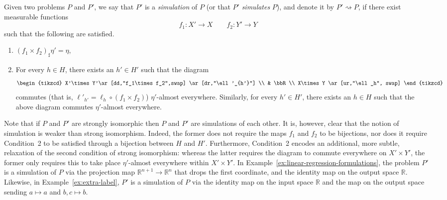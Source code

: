 \documentclass[twoside,11pt]{article}
\begin{document}
\begin{definition}
    Given two problems $P$ and $P'$, we say that $P'$ is a \emph{simulation} of $P$ (or that $P'$ \emph{simulates} $P$), and denote it by $P'\rightsquigarrow P$, if there exist measurable functions
    \[f_1:X'\to X \qquad f_2:Y'\to Y\]
    such that the following are satisfied.
    \begin{enumerate}
        \item $(f_1\times f_2)_\sharp \eta' = \eta$,       
        \item For every $h\in H$, there exists an $h'\in H'$ such that the diagram
        \[
        \begin{tikzcd}
            X'\times Y'\ar[dd,"f_1\times f_2",swap] \ar[dr,"\ell'_{h'}"]
            \\
            & \bbR
            \\
            X\times Y \ar[ur,"\ell_h", swap]
        \end{tikzcd}    
        \]
        commutes (that is, $\ell'_{h'}= \ell_h \circ (f_1\times f_2)$) $\eta'$-almost everywhere.
        Similarly, for every $h' \in H'$, there exists an $h\in H$ such that the above diagram commutes $\eta'$-almost everywhere.
    \end{enumerate}
\end{definition}

   

Note that if $P$ and $P'$ are strongly isomorphic then $P$ and $P'$ are simulations of each other. It is, however, clear that the notion of simulation is weaker than strong isomorphism. Indeed, the former does not require the maps $f_1$ and $f_2$ to be bijections, nor does it require   Condition~2 to be satisfied through a bijection between $H$ and $H'$. Furthermore, Condition~2 encodes an additional, more subtle, relaxation of the second condition of strong isomorphism: whereas the latter requires the diagram to commute everywhere on $X'\times Y'$, the former only requires this to take place $\eta'$-almost everywhere within $X'\times Y'$. In Example~\ref{ex:linear-regression-formulations}, the problem $P'$ is a simulation of $P$ via the projection map $\mathbb R^{n+1} \to \mathbb R^n$ that drops the first coordinate, and the identity map on the output space $\mathbb R$. Likewise, in Example~\ref{ex:extra-label}, $P'$ is a simulation of $P$ via the identity map on the input space $\mathbb R$ and the map on the output space sending $a\mapsto a$ and $b,c\mapsto b$.  
\end{document}
